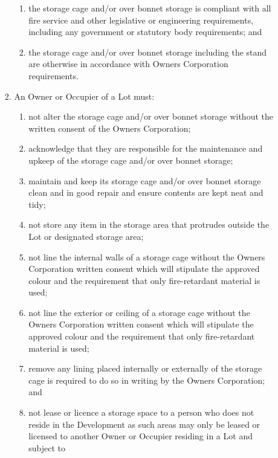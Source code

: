 \documentclass{article}
\begin{document}
\begin{enumerate}[label=\arabic*.]
\begin{enumerate}[label=\arabic{enumi}.\arabic*.]
\begin{enumerate}[label=(\arabic*)]
\begin{enumerate}[label=(\alph*)]
\item  the storage cage and/or over bonnet storage is compliant with all fire service and other legislative or engineering requirements, including any government or statutory body requirements; and

\item  the storage cage and/or over bonnet storage including the stand are otherwise in accordance with Owners Corporation requirements.

\end{enumerate}

\item  An Owner or Occupier of a Lot must:

\begin{enumerate}[label=(\alph*)]

\item  not alter the storage cage and/or over bonnet storage without the written consent of the Owners Corporation;

\item  acknowledge that they are responsible for the maintenance and upkeep of the storage cage and/or over bonnet storage;

\item  maintain and keep its storage cage and/or over bonnet storage clean and in good repair and ensure contents are kept neat and tidy;

\item  not store any item in the storage area that protrudes outside the Lot or designated storage area;

\item  not line the internal walls of a storage cage without the Owners Corporation written consent which will stipulate the approved colour and the requirement that only fire-retardant material is used;

\item  not line the exterior or ceiling of a storage cage without the Owners Corporation written consent which will stipulate the approved colour and the requirement that only fire-retardant material is used;

\item  remove any lining placed internally or externally of the storage cage is required to do so in writing by the Owners Corporation; and

\item  not lease or licence a storage space to a person who does not reside in the Development as such areas may only be leased or licensed to another Owner or Occupier residing in a Lot and subject to
\newpage


\end{enumerate}
\end{enumerate}
\end{enumerate}
\end{enumerate}
\end{document}
